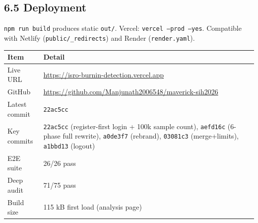 \documentclass[11pt,a4paper]{article}
\newcommand{\code}[1]{\texttt{\small #1}}
\begin{document}
\subsection*{6.5 Deployment}
\code{npm run build} produces static \code{out/}. Vercel: \code{vercel --prod --yes}.
Compatible with Netlify (\code{public/\_redirects}) and Render (\code{render.yaml}).

\begin{center}
\begin{tabular}{@{}ll@{}}
\toprule
\textbf{Item} & \textbf{Detail}\\
\midrule
Live URL & \url{https://isro-burnin-detection.vercel.app}\\
GitHub & \url{https://github.com/Manjunath2006548/maverick-sih2026}\\
Latest commit & \code{22ac5cc}\\
Key commits & \code{22ac5cc} (register-first login + 100k sample count), \code{aefd16c} (6-phase full rewrite), \code{a0de3f7} (rebrand), \code{03081c3} (merge+limits), \code{a1bbd13} (logout)\\
E2E suite & 26/26 pass\\
Deep audit & 71/75 pass\\
Build size & 115 kB first load (analysis page)\\
\bottomrule
\end{tabular}
\end{center}
\end{document}
